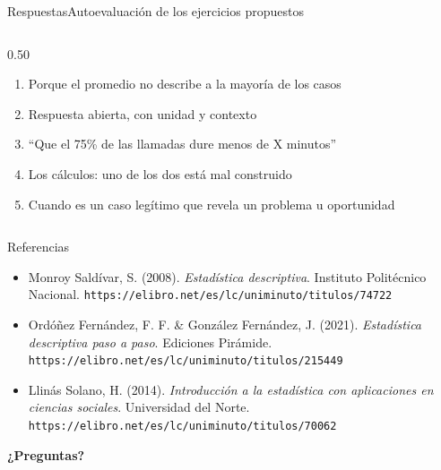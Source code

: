 \documentclass[aspectratio=169,10pt]{beamer}
\begin{document}
\begin{frame}{Respuestas}{Autoevaluación de los ejercicios propuestos}
\begin{columns}[T,onlytextwidth]
\begin{column}{0.50\textwidth}
\begin{enumerate}
        \item Porque el promedio no describe a la mayoría de los casos
        \item Respuesta abierta, con unidad y contexto
        \item ``Que el 75\% de las llamadas dure menos de X minutos''
        \item Los cálculos: uno de los dos está mal construido
        \item Cuando es un caso legítimo que revela un problema u oportunidad
      \end{enumerate}
    \end{column}
  \end{columns}
\end{frame}

\begin{frame}{Referencias}
  \footnotesize
  \begin{itemize}
    \item[{[1]}] Monroy Saldívar, S. (2008). \textit{Estadística descriptiva}.
      Instituto Politécnico Nacional.
      \texttt{https://elibro.net/es/lc/uniminuto/titulos/74722}
    \item[{[2]}] Ordóñez Fernández, F. F. \& González Fernández, J. (2021).
      \textit{Estadística descriptiva paso a paso}. Ediciones Pirámide.
      \texttt{https://elibro.net/es/lc/uniminuto/titulos/215449}
    \item[{[3]}] Llinás Solano, H. (2014). \textit{Introducción a la
      estadística con aplicaciones en ciencias sociales}. Universidad del
      Norte. \texttt{https://elibro.net/es/lc/uniminuto/titulos/70062}
  \end{itemize}

  \vspace{0.35cm}
  \begin{center}
    {\Large\color{uniAzul}\textbf{¿Preguntas?}}
  \end{center}
\end{frame}
\end{document}
